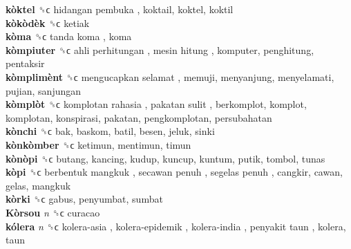 \textbf{kòktel} ␝ϲ   hidangan pembuka , koktail, koktel, koktil  \\
\textbf{kòkòdèk} ␝ϲ  ketiak  \\
\textbf{kòma} ␝ϲ   tanda koma , koma  \\
\textbf{kòmpiuter} ␝ϲ   ahli perhitungan ,  mesin hitung , komputer, penghitung, pentaksir  \\
\textbf{kòmplimènt} ␝ϲ   mengucapkan selamat , memuji, menyanjung, menyelamati, pujian, sanjungan  \\
\textbf{kòmplòt} ␝ϲ   komplotan rahasia ,  pakatan sulit , berkomplot, komplot, komplotan, konspirasi, pakatan, pengkomplotan, persubahatan  \\
\textbf{kònchi} ␝ϲ  bak, baskom, batil, besen, jeluk, sinki  \\
\textbf{kònkòmber} ␝ϲ  ketimun, mentimun, timun  \\
\textbf{kònòpi} ␝ϲ  butang, kancing, kudup, kuncup, kuntum, putik, tombol, tunas  \\
\textbf{kòpi} ␝ϲ   berbentuk mangkuk ,  secawan penuh ,  segelas penuh , cangkir, cawan, gelas, mangkuk  \\
\textbf{kòrki} ␝ϲ  gabus, penyumbat, sumbat  \\
\textbf{Kòrsou} \emph{n}  ␝ϲ  curacao  \\
\textbf{kólera} \emph{n}  ␝ϲ   kolera-asia ,  kolera-epidemik ,  kolera-india ,  penyakit taun , kolera, taun  \\
